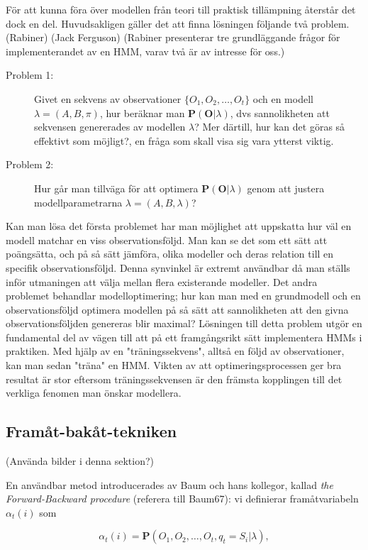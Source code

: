 \documentclass[../rapport_MVEX01-11-05]{subfiles}
\begin{document}
För att kunna föra över modellen från teori till praktisk tillämpning
återstår det dock en del. Huvudsakligen gäller det att finna lösningen
följande två problem. (Rabiner) (Jack Ferguson) (Rabiner presenterar
tre grundläggande frågor för implementerandet av en HMM, varav två är
av intresse för oss.)
\begin{description}
\item[Problem 1:] Givet en sekvens av observationer
  $\{O_1,O_2,\dots,O_t\}$ och en modell $\lambda = (A,B,\pi)$, hur
  beräknar man $\textbf{P}(\textbf{O}|\lambda)$, dvs sannolikheten att
  sekvensen genererades av modellen $\lambda$? Mer därtill, hur kan
  det göras så effektivt som möjligt?, en fråga som skall visa sig
  vara ytterst viktig.  
\item[Problem 2:] Hur går man tillväga för att optimera
  $\textbf{P}(\textbf{O}|\lambda)$ genom att justera
  modellparametrarna $\lambda = (A,B,\lambda)$? 
\end{description}

Kan man lösa det första problemet har man möjlighet att uppskatta hur
väl en modell matchar en viss observationsföljd. Man kan se det som
ett sätt att poängsätta, och på så sätt jämföra, olika modeller och
deras relation till en specifik observationsföljd. Denna synvinkel är
extremt användbar då man ställs inför utmaningen att välja mellan
flera existerande modeller. 
Det andra problemet behandlar modelloptimering; hur kan man med en
grundmodell och en observationsföljd optimera modellen på så sätt att
sannolikheten att den givna observationsföljden genereras blir
maximal? Lösningen till detta problem utgör en fundamental del av
vägen till att på ett framgångsrikt sätt implementera HMMs i
praktiken. Med hjälp av en "träningssekvens", alltså en följd av
observationer, kan man sedan "träna" en HMM. Vikten av att
optimeringsprocessen ger bra resultat är stor eftersom
träningssekvensen är den främsta kopplingen till det verkliga fenomen
man önskar modellera.      

\subsection{Framåt-bakåt-tekniken}

(Använda bilder i denna sektion?)

En användbar metod introducerades av Baum och hans kollegor, kallad
\emph{the Forward-Backward procedure} (referera till Baum67): vi
definierar framåtvariabeln $\alpha_t(i)$ som 

\begin{equation*}
\alpha_t(i) = \textbf{P}(O_1,O_2,\dots,O_t,q_t = S_i | \lambda),
\end{equation*}
\end{document}
